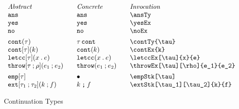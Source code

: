 \documentclass[11pt]{article}
\begin{document}
\begin{figure}

  \begin{small}
    \begin{displaymath}
      \begin{array}{l@{\qquad}l@{\qquad}l@{\qquad}l}
        \textit{Abstract} & \textit{Concrete} & \textit{Invocation} \\
        \ansTy                         & \ansTy*             & \verb|\ansTy|                         \\
        \yesEx                         & \yesEx*             & \verb|\yesEx|                         \\
        \noEx                          & \noEx*              & \verb|\noEx|                          \\[1ex]

        \contTy{\tau}                  & \contTy*{\tau}      & \verb|\contTy{\tau}|                  \\
        \contEx{k}                     & \contEx*{k}         & \verb|\contEx{k} |                    \\
        \letccEx[\tau]{x}{e}           & \letccEx*{x}{e}     & \verb|\letccEx[\tau]{x}{e}|           \\
        \throwEx[\tau][\rho]{e_1}{e_2} & \throwEx*{e_1}{e_2} & \verb|\throwEx[\tau][\rho]{e_1}{e_2}| \\[1ex]

        \empStk[\tau]                  & \empStk*[\tau]      & \verb|\empStk[\tau]|                  \\
        \extStk[\tau_1][\tau_2]{k}{f}  & \extStk*{k}{f}      & \verb|\extStk[\tau_1][\tau_2]{k}{f}|
      \end{array}
    \end{displaymath}
  \end{small}

  \caption{Continuation Types}
  \label{fig:cont}
\end{figure}
\end{document}
